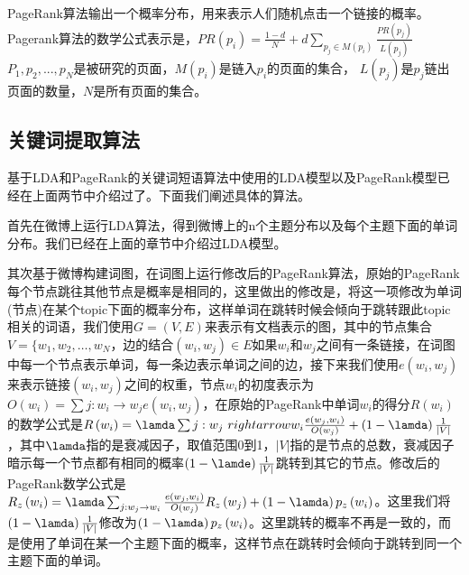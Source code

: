 \documentclass[master]{njuthesis}
\begin{document}
    PageRank算法输出一个概率分布，用来表示人们随机点击一个链接的概率。Pagerank算法的数学公式表示是，$ PR\left(p_i\right) = \frac{1-d}{N}+d\sum_{p_j \in M\left(p_i\right)} \frac{PR\left(p_j\right)}{L\left(p_j\right)}$$P_1,p_2,...,p_N$是被研究的页面，$M\left(p_i\right)$是链入$p_i$的页面的集合， $L\left(p_j\right)$是$p_j$链出页面的数量，$N$是所有页面的集合。

\subsection{关键词提取算法}

    基于LDA和PageRank的关键词短语算法中使用的LDA模型以及PageRank模型已经在上面两节中介绍过了。下面我们阐述具体的算法。

    首先在微博上运行LDA算法，得到微博上的n个主题分布以及每个主题下面的单词分布。我们已经在上面的章节中介绍过LDA模型。
    
    其次基于微博构建词图，在词图上运行修改后的PageRank算法，原始的PageRank每个节点跳往其他节点是概率是相同的，这里做出的修改是，将这一项修改为单词(节点)在某个topic下面的概率分布，这样单词在跳转时候会倾向于跳转跟此topic相关的词语，我们使用$G=\left(V,E\right)$来表示有文档表示的图，其中的节点集合$V=\{w_1,w_2,\dots,w_N$，边的结合$\left(w_i,w_j\right) \in E$如果$w_i$和$w_j$之间有一条链接，在词图中每一个节点表示单词，每一条边表示单词之间的边，接下来我们使用$e\left(w_i,w_j\right)$来表示链接$\left(w_i,w_j\right)$之间的权重，节点$w_i$的初度表示为$O\left(w_i\right) = \sum{j:w_i \rightarrow w_j} e\left(w_i,w_j\right)$，在原始的PageRank中单词$w_i$的得分$R\left(w_i\right)$的数学公式是$R\left( w_i \right) = \lamda \sum{j:w_j \ rightarrow w_i} \frac{e\left(w_j,w_i\right)}{O\left(w_j\right)}+\left(1-\lamda\right)\frac{1}{\vert V \vert}$，其中$\lamda$指的是衰减因子，取值范围0到1，$\vert V \vert$指的是节点的总数，衰减因子暗示每一个节点都有相同的概率$\left(1-\lamde\right)\frac{1}{\vert V \vert}$跳转到其它的节点。修改后的PageRank数学公式是$R_z\left( w_i \right) = \lamda \sum_{j:w_j \rightarrow w_i} \frac{e\left(w_j, w_i\right)}{O\left(w_j\right)}R_z\left(w_j\right)+\left( 1-\lamda \right)p_z\left(w_i\right)$。这里我们将$\left(1-\lamda\right)\frac{1}{\vert V \vert}$修改为$\left( 1-\lamda\right)p_z\left(w_i\right)$。这里跳转的概率不再是一致的，而是使用了单词在某一个主题下面的概率，这样节点在跳转时会倾向于跳转到同一个主题下面的单词。
    
\end{document}
